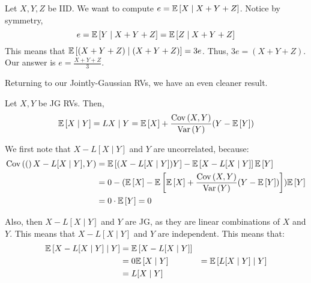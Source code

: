 \begin{example}
    Let $X, Y, Z$ be IID. We want to compute $e = \mathbb{E}\left[ X \mid X + Y + Z \right]$. Notice by symmetry,
    \[ e = \mathbb{E}\left[ Y \mid X + Y + Z \right] = \mathbb{E}\left[ Z \mid X + Y + Z \right] \]
    This means that $\mathbb{E}\left[ (X + Y+ Z) \mid (X + Y + Z) \right] = 3e$. Thus, $3e = (X + Y + Z)$.
    Our answer is $e = \frac{X + Y+ Z}{3}$.
\end{example}

Returning to our Jointly-Gaussian RVs, we have an even cleaner result.

\begin{theorem}
    Let $X, Y$ be JG RVs. Then,
    \[ \mathbb{E}\left[ X \mid Y \right] = L{X \mid Y} = \mathbb{E}\left[ X \right] + \frac{\text{Cov}\left( X, Y \right)}{\text{Var}\left( Y \right)} ( Y- \mathbb{E}\left[ Y \right]) \]

    \begin{proof*}
        We first note that $X - L[X \mid Y]$ and $Y$ are uncorrelated, because:
        \begin{align*}
            \text{Cov}\left( ( \right)X - L[X \mid Y], Y) &= \mathbb{E}\left[ (X - L[X \mid Y]) Y \right] - \mathbb{E}\left[ X - L[X \mid Y] \right] \mathbb{E}\left[ Y \right] \\
            &= 0 - (\mathbb{E}\left[ X \right] - \mathbb{E}\left[ \mathbb{E}\left[ X \right] + \frac{\text{Cov}\left( X, Y \right)}{\text{Var}\left( Y \right)}(Y - \mathbb{E}\left[ Y \right]) \right]) \mathbb{E}\left[ Y \right] \\
            &= 0 \cdot \mathbb{E}\left[ Y \right] = 0
        \end{align*}

        Also, then $X - L[X \mid Y]$ and $Y$ are JG, as they are linear combinations of $X$ and $Y$. This means that $X - L[X \mid Y]$ and $Y$ are independent.
        This means that:
        \begin{align*}
            \mathbb{E}\left[ X - L[X \mid Y] \mid Y \right] &= \mathbb{E}\left[ X - L[X \mid Y] \right] \\
            &= 0
            \mathbb{E}\left[ X \mid Y \right] &= \mathbb{E}\left[ L[X \mid Y] \mid Y \right] \\
            &= L[X \mid Y]
        \end{align*}
    \end{proof*}
\end{theorem}